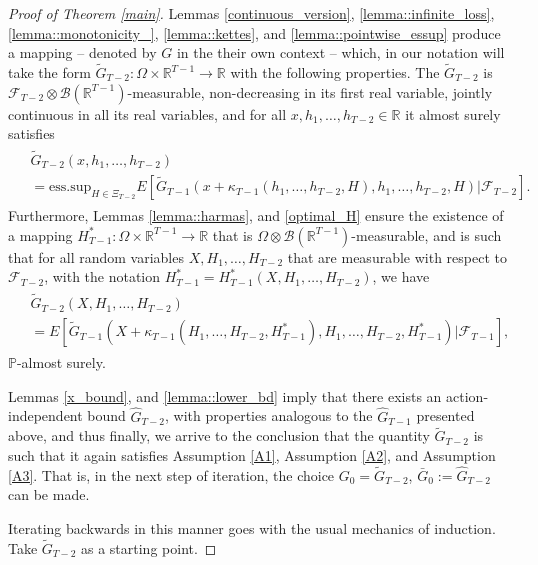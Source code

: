 \documentclass[a4paper]{article}
\begin{document}
\begin{proof}[Proof of Theorem \ref{main}]
Lemmas \ref{continuous_version}, \ref{lemma::infinite_loss}, \ref{lemma::monotonicity_}, \ref{lemma::kettes}, 
and \ref{lemma::pointwise_essup} produce a mapping -- denoted by $G$ in the their own context -- 
which, in our notation will take the form $\tilde{G}_{T-2}:\Omega \times \mathbb{R}^{T-1} \to \mathbb{R}$ with the following properties. 
The $\tilde{G}_{T-2}$ is $\mathcal{F}_{T-2} \otimes \mathcal{B}(\mathbb{R}^{T-1})$-measurable, non-decreasing in its first real variable, 
jointly continuous in all its real variables, and for all $x, h_1, \ldots, h_{T-2} \in \mathbb{R}$ it almost surely satisfies
\begin{align}\label{okt3}
\begin{split}
& \tilde{G}_{T-2}(x, h_1, \ldots, h_{T-2})
\\
&=
\mbox{ess.sup}_{H \in \Xi_{T-2}}E\left[\tilde{G}_{T-1}(x + \kappa_{T-1}(h_1, \ldots, h_{T-2}, H), 
h_1, \ldots, h_{T-2}, H) \vert \mathcal{F}_{T-2} \right].
\end{split}
\end{align}
Furthermore, Lemmas \ref{lemma::harmas}, and \ref{optimal_H} ensure the existence of a mapping 
$H^{*}_{T-1}:\Omega \times \mathbb{R}^{T-1} \to \mathbb{R}$ that is $\Omega \otimes \mathcal{B}(\mathbb{R}^{T-1})$-measurable, 
and is such that for all random variables $X, H_1, \ldots, H_{T-2}$ that are measurable with respect to  
$\mathcal{F}_{T-2}$, with the notation $H^{*}_{T-1}= H^{*}_{T-1}(X, H_1, \ldots, H_{T-2})$, we have
\begin{align}\label{okt4}
\begin{split}
& \tilde{G}_{T-2}(X, H_1, \ldots, H_{T-2})
\\
&=
E\left[\tilde{G}_{T-1}(X + \kappa_{T-1}(H_1, \ldots, H_{T-2}, H^{*}_{T-1}), H_1, \ldots, H_{T-2}, H^{*}_{T-1}) \vert 
\mathcal{F}_{T-1} \right],
\end{split}
\end{align}
$\mathbb{P}$-almost surely.


Lemmas \ref{x_bound}, and \ref{lemma::lower_bd} imply that there exists an action-independent bound 
$\hat G_{T-2}$, with properties analogous to the $\hat G_{T-1}$ presented above, and thus finally, 
we arrive to the conclusion that the quantity $\tilde{G}_{T-2}$ is such that it again satisfies 
Assumption \ref{A1}, Assumption \ref{A2}, and Assumption \ref{A3}. That is, in 
the next step of iteration, the choice $G_0 = \tilde{G}_{T-2}$, $\bar{G}_{0}:=\hat{G}_{T-2}$ can be made.

Iterating backwards in this manner goes with the usual mechanics of induction. Take $\tilde{G}_{T-2}$ 
as a starting point. 


\end{proof}
\end{document}
